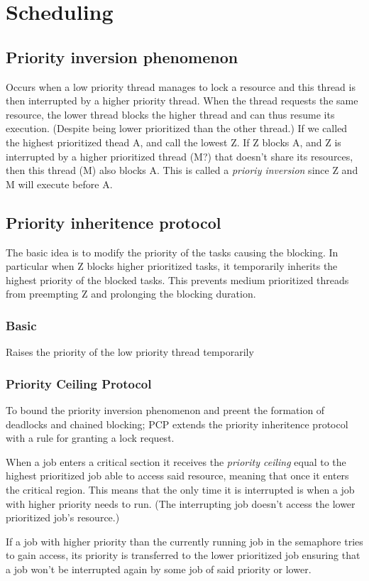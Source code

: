 \documentclass[a4paper]{article}
\begin{document}
\section{Scheduling}
\subsection{Priority inversion phenomenon}
Occurs when a low priority thread manages to lock a resource and this thread
is then interrupted by a higher priority thread. When the thread requests the
same resource, the lower thread blocks the higher thread and can thus resume
its execution. (Despite being lower prioritized than the other thread.)
If we called the highest prioritized thead A, and call the lowest Z. If Z
blocks A, and Z is interrupted by a higher prioritized thread (M?) that doesn't
share its resources, then this thread (M) also blocks A. This is called a 
\emph{prioriy inversion} since Z and M will execute before A.

\subsection{Priority inheritence protocol}
The basic idea is to modify the priority of the tasks causing the blocking. In
particular when Z blocks higher prioritized tasks, it temporarily inherits the
highest priority of the blocked tasks. This prevents medium prioritized threads
from preempting Z and prolonging the blocking duration.
\subsubsection{Basic}
Raises the priority of the low priority thread temporarily
\subsubsection{Priority Ceiling Protocol}
To bound the priority inversion phenomenon and preent the formation of deadlocks
and chained blocking; PCP extends the priority inheritence protocol with a
rule for granting a lock request.

When a job enters a critical section it receives the \emph{priority ceiling} 
equal to the highest prioritized job able to access said resource, meaning that
once it enters the critical region. This means that the only time it is
interrupted is when a job with higher priority needs to run. (The interrupting
job doesn't access the lower prioritized job's resource.)

If a job with higher priority than the currently running job in the semaphore
tries to gain access, its priority is transferred to the lower prioritized job
ensuring that a job won't be interrupted again by some job of said priority or
lower.
\end{document}
